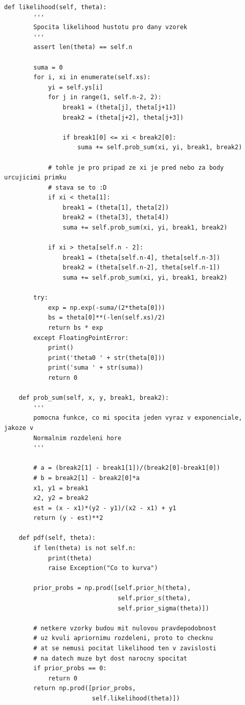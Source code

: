 \documentclass[czech,master,public,dept470,male,cpdeclaration,oneside, python]{diploma}
\begin{document}
\begin{lstlisting}[caption=implementace aposteriorního rozdělení pro po částech lineární regresi]
    def likelihood(self, theta):
        '''
        Spocita likelihood hustotu pro dany vzorek
        '''
        assert len(theta) == self.n

        suma = 0
        for i, xi in enumerate(self.xs):
            yi = self.ys[i]
            for j in range(1, self.n-2, 2):
                break1 = (theta[j], theta[j+1])
                break2 = (theta[j+2], theta[j+3])

                if break1[0] <= xi < break2[0]:
                    suma += self.prob_sum(xi, yi, break1, break2)

            # tohle je pro pripad ze xi je pred nebo za body urcujicimi primku
            # stava se to :D
            if xi < theta[1]:
                break1 = (theta[1], theta[2])
                break2 = (theta[3], theta[4])
                suma += self.prob_sum(xi, yi, break1, break2)

            if xi > theta[self.n - 2]:
                break1 = (theta[self.n-4], theta[self.n-3])
                break2 = (theta[self.n-2], theta[self.n-1])
                suma += self.prob_sum(xi, yi, break1, break2)

        try:
            exp = np.exp(-suma/(2*theta[0]))
            bs = theta[0]**(-len(self.xs)/2)
            return bs * exp
        except FloatingPointError:
            print()
            print('theta0 ' + str(theta[0]))
            print('suma ' + str(suma))
            return 0

    def prob_sum(self, x, y, break1, break2):
        '''
        pomocna funkce, co mi spocita jeden vyraz v exponenciale, jakoze v
        Normalnim rozdeleni hore
        '''

        # a = (break2[1] - break1[1])/(break2[0]-break1[0])
        # b = break2[1] - break2[0]*a
        x1, y1 = break1
        x2, y2 = break2
        est = (x - x1)*(y2 - y1)/(x2 - x1) + y1
        return (y - est)**2

    def pdf(self, theta):
        if len(theta) is not self.n:
            print(theta)
            raise Exception("Co to kurva")

        prior_probs = np.prod([self.prior_h(theta),
                               self.prior_s(theta),
                               self.prior_sigma(theta)])

        # netkere vzorky budou mit nulovou pravdepodobnost
        # uz kvuli apriornimu rozdeleni, proto to checknu
        # at se nemusi pocitat likelihood ten v zavislosti
        # na datech muze byt dost narocny spocitat
        if prior_probs == 0:
            return 0
        return np.prod([prior_probs,
                        self.likelihood(theta)])


\end{lstlisting}
\end{document}
